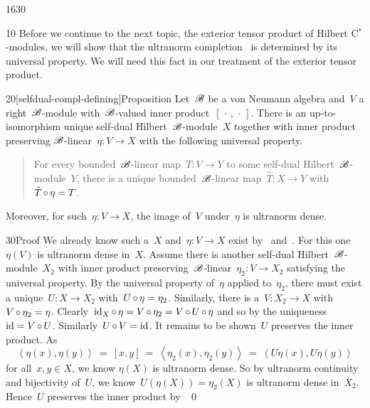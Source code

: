 \begin{parsec}{1630}%
\begin{point}{10}%
Before we continue to the next topic,
    the exterior tensor product of Hilbert C$^*$-modules,
    we will show that the ultranorm completion~
    is determined by its universal property.
    We will need this fact in our treatment
        of the exterior tensor product.
\end{point}
\begin{point}{20}[selfdual-compl-defining]{Proposition}%
Let~$\mathscr{B}$ be a von Neumann algebra and~$V$ a right~$\mathscr{B}$-module
    with~$\mathscr{B}$-valued inner product~$[\,\cdot\,,\,\cdot\,]$.
There is an up-to-isomorphism unique
    self-dual Hilbert~$\mathscr{B}$-module~$X$
    together with inner product preserving $\mathscr{B}$-linear~$\eta \colon V \to X$
    with the following universal property.
    \begin{quote}
    For every bounded~$\mathscr{B}$-linear map~$T\colon V \to Y$
    to some self-dual Hilbert~$\mathscr{B}$-module~$Y$,
    there is a unique bounded~$\mathscr{B}$-linear map~$\hat{T}\colon X \to Y$
    with~$\hat{T} \mathop{\circ} \eta = T$.
    \end{quote}
Moreover, for such~$\eta\colon V \to X$,
    the image of~$V$ under~$\eta$ is ultranorm dense.
\begin{point}{30}{Proof}%
We already know such a~$X$ and~$\eta\colon V \to X$
    exist by~
    and~.
For this one~$\eta(V)$ is ultranorm dense in~$X$.
Assume there is another self-dual Hilbert~$\mathscr{B}$-module~$X_2$
    with inner product preserving~$\mathscr{B}$-linear~$\eta_2\colon V \to X_2$
    satisfying the universal property.
By the universal property of~$\eta$ applied to~$\eta_2$,
    there must exist a unique~$U \colon X  \to X_2$
    with~$U \mathop{\circ} \eta  = \eta_2$.
Similarly, there is a~$V \colon X_2 \to X$
    with~$V \mathop{\circ} \eta_2 = \eta$.
Clearly~$\mathrm{id}_{X} \mathop{\circ} \eta = V \mathop{\circ} \eta_2 = V \mathop{\circ} U \mathop{\circ} \eta$
    and so by the uniqueness~$\mathrm{id} = V\mathop{\circ} U$.
    Similarly~$U \mathop{\circ} V = \mathrm{id}$.
It remains to be shown~$U$ preserves the inner product.
As
\begin{equation*}
    \left<\eta(x),\eta(y)\right>
    \ =\  [x,y]
    \ =\  \left<\eta_2(x), \eta_2(y)\right>
    \ =\  \left<U \eta(x), U \eta(y)\right>
\end{equation*}
for all~$x,y \in X$, we know
$\eta(X)$ is ultranorm dense.
So by ultranorm continuity and bijectivity of~$U$,
    we know~$U(\eta(X)) = \eta_2(X)$ is ultranorm dense in~$X_2$.
Hence~$U$ preserves the inner product by~
\qed
\end{point}
\end{point}
\end{parsec}

